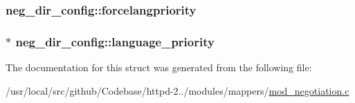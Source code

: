 \subsubsection[{\texorpdfstring{forcelangpriority}{forcelangpriority}}]{ neg\+\_\+dir\+\_\+config\+::forcelangpriority}\hypertarget{structneg__dir__config_a8b500a4aeaeb7886aa34e021077c29dd}{}\label{structneg__dir__config_a8b500a4aeaeb7886aa34e021077c29dd}
\subsubsection[{\texorpdfstring{language\+\_\+priority}{language_priority}}]{$\ast$ neg\+\_\+dir\+\_\+config\+::language\+\_\+priority}\hypertarget{structneg__dir__config_a67c05d61ade2f50144f8fef467a30037}{}\label{structneg__dir__config_a67c05d61ade2f50144f8fef467a30037}


The documentation for this struct was generated from the following file\+:\begin{DoxyCompactItemize}
\item 
/usr/local/src/github/\+Codebase/httpd-\/2../modules/mappers/\hyperlink{mod__negotiation_8c}{mod\+\_\+negotiation.\+c}\end{DoxyCompactItemize}
